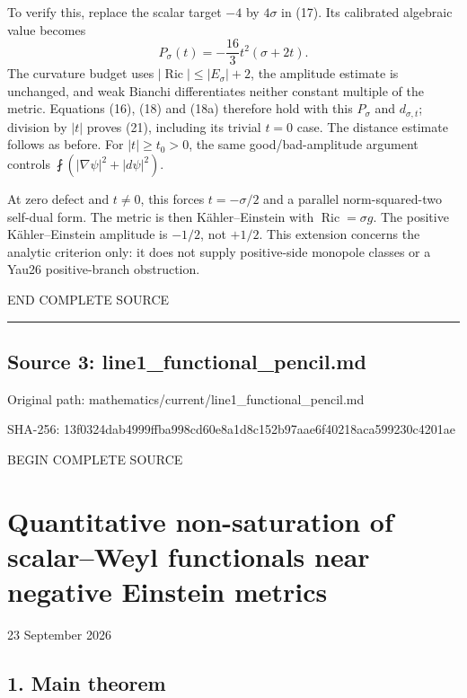 \documentclass[
  10pt,
]{article}
\begin{document}
To verify this, replace the scalar target \(-4\) by \(4\sigma\) in (17).
Its calibrated algebraic value becomes \[
P_\sigma(t)=-\frac{16}{3}t^2(\sigma+2t).
\] The curvature budget uses \(|\operatorname{Ric}|\le|E_\sigma|+2\),
the amplitude estimate is unchanged, and weak Bianchi differentiates
neither constant multiple of the metric. Equations (16), (18) and (18a)
therefore hold with this \(P_\sigma\) and \(d_{\sigma,t}\); division by
\(|t|\) proves (21), including its trivial \(t=0\) case. The distance
estimate follows as before. For \(|t|\ge t_0>0\), the same
good/bad-amplitude argument controls
\(\fint(|\nabla\psi|^2+|d\psi|^2)\).

At zero defect and \(t\ne0\), this forces \(t=-\sigma/2\) and a parallel
norm-squared-two self-dual form. The metric is then Kähler--Einstein
with \(\operatorname{Ric}=\sigma g\). The positive Kähler--Einstein
amplitude is \(-1/2\), not \(+1/2\). This extension concerns the
analytic criterion only: it does not supply positive-side monopole
classes or a Yau26 positive-branch obstruction.

END COMPLETE SOURCE

\begin{center}\rule{0.5\linewidth}{0.5pt}\end{center}

\hypertarget{source-3-line1_functional_pencil.md}{%
\subsection{Source 3:
line1\_functional\_pencil.md}\label{source-3-line1_functional_pencil.md}}

Original path: mathematics/current/line1\_functional\_pencil.md

SHA-256:
13f0324dab4999ffba998cd60e8a1d8c152b97aae6f40218aca599230c4201ae

BEGIN COMPLETE SOURCE

\hypertarget{quantitative-non-saturation-of-scalarweyl-functionals-near-negative-einstein-metrics}{%
\section{Quantitative non-saturation of scalar--Weyl functionals near
negative Einstein
metrics}\label{quantitative-non-saturation-of-scalarweyl-functionals-near-negative-einstein-metrics}}

23 September 2026

\hypertarget{main-theorem}{%
\subsection{1. Main theorem}\label{main-theorem}}
\end{document}
